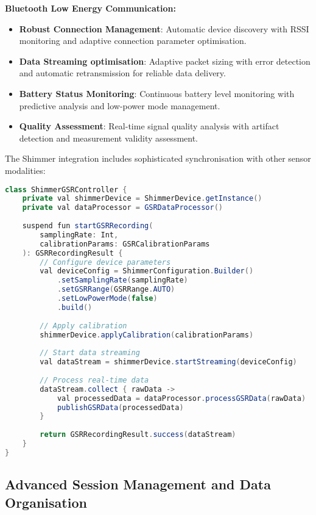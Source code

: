\documentclass[11pt,a4paper]{report}
\begin{document}
\textbf{Bluetooth Low Energy Communication:}
\begin{itemize}
  \item \textbf{Robust Connection Management}: Automatic device discovery with RSSI monitoring and adaptive connection parameter optimisation.
  \item \textbf{Data Streaming optimisation}: Adaptive packet sizing with error detection and automatic retransmission for reliable data delivery.
  \item \textbf{Battery Status Monitoring}: Continuous battery level monitoring with predictive analysis and low-power mode management.
  \item \textbf{Quality Assessment}: Real-time signal quality analysis with artifact detection and measurement validity assessment.
\end{itemize}

The Shimmer integration includes sophisticated synchronisation with other sensor modalities:

\begin{lstlisting}[language=Java]
class ShimmerGSRController {
    private val shimmerDevice = ShimmerDevice.getInstance()
    private val dataProcessor = GSRDataProcessor()
    
    suspend fun startGSRRecording(
        samplingRate: Int,
        calibrationParams: GSRCalibrationParams
    ): GSRRecordingResult {
        // Configure device parameters
        val deviceConfig = ShimmerConfiguration.Builder()
            .setSamplingRate(samplingRate)
            .setGSRRange(GSRRange.AUTO)
            .setLowPowerMode(false)
            .build()
        
        // Apply calibration
        shimmerDevice.applyCalibration(calibrationParams)
        
        // Start data streaming
        val dataStream = shimmerDevice.startStreaming(deviceConfig)
        
        // Process real-time data
        dataStream.collect { rawData ->
            val processedData = dataProcessor.processGSRData(rawData)
            publishGSRData(processedData)
        }
        
        return GSRRecordingResult.success(dataStream)
    }
}
\end{lstlisting}

\subsection{Advanced Session Management and Data Organisation}
\end{document}

